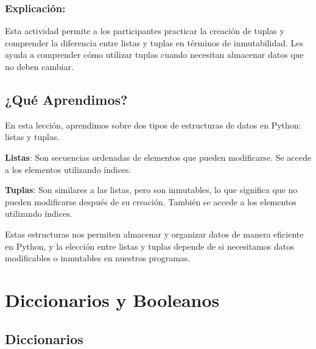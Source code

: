 \documentclass[
  a4paper,
  DIV=11,
  numbers=noendperiod,
  onepage,
  openany]{scrreprt}
\begin{document}
\subsection{Explicación:}\label{explicaciuxf3n-9}

Esta actividad permite a los participantes practicar la creación de
tuplas y comprender la diferencia entre listas y tuplas en términos de
inmutabilidad. Les ayuda a comprender cómo utilizar tuplas cuando
necesitan almacenar datos que no deben cambiar.

\section{¿Qué Aprendimos?}\label{quuxe9-aprendimos-2}

En esta lección, aprendimos sobre dos tipos de estructuras de datos en
Python: listas y tuplas.

\textbf{Listas}: Son secuencias ordenadas de elementos que pueden
modificarse. Se accede a los elementos utilizando índices.

\textbf{Tuplas}: Son similares a las listas, pero son inmutables, lo que
significa que no pueden modificarse después de su creación. También se
accede a los elementos utilizando índices.

Estas estructuras nos permiten almacenar y organizar datos de manera
eficiente en Python, y la elección entre listas y tuplas depende de si
necesitamos datos modificables o inmutables en nuestros programas.

\chapter{Diccionarios y Booleanos}\label{diccionarios-y-booleanos}

\section{Diccionarios}\label{diccionarios}
\end{document}
